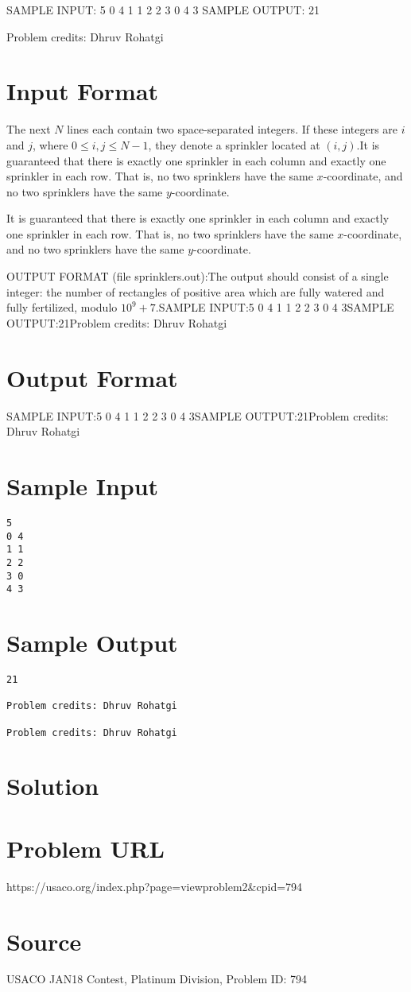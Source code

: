 \documentclass[12pt]{article}
\begin{document}
SAMPLE INPUT:
5
0 4
1 1
2 2
3 0
4 3
SAMPLE OUTPUT: 
21


Problem credits: Dhruv Rohatgi



\section*{Input Format}
The next $N$ lines each contain two space-separated integers. If these integers
are $i$ and $j$, where $0 \leq i,j \leq N-1$, they denote a sprinkler located at
$(i,j)$.It is guaranteed that there is exactly one sprinkler in each column and exactly
one sprinkler in each row. That is, no two sprinklers have the same
$x$-coordinate, and no two sprinklers have the same $y$-coordinate.

It is guaranteed that there is exactly one sprinkler in each column and exactly
one sprinkler in each row. That is, no two sprinklers have the same
$x$-coordinate, and no two sprinklers have the same $y$-coordinate.

OUTPUT FORMAT (file sprinklers.out):The output should consist of a single integer: the number of rectangles of
positive area which are fully watered and fully fertilized, modulo $10^9 + 7$.SAMPLE INPUT:5
0 4
1 1
2 2
3 0
4 3SAMPLE OUTPUT:21Problem credits: Dhruv Rohatgi

\section*{Output Format}
SAMPLE INPUT:5
0 4
1 1
2 2
3 0
4 3SAMPLE OUTPUT:21Problem credits: Dhruv Rohatgi

\section*{Sample Input}
\begin{verbatim}
5
0 4
1 1
2 2
3 0
4 3
\end{verbatim}

\section*{Sample Output}
\begin{verbatim}
21

Problem credits: Dhruv Rohatgi

Problem credits: Dhruv Rohatgi
\end{verbatim}

\section*{Solution}


\section*{Problem URL}
https://usaco.org/index.php?page=viewproblem2&cpid=794

\section*{Source}
USACO JAN18 Contest, Platinum Division, Problem ID: 794
\end{document}
